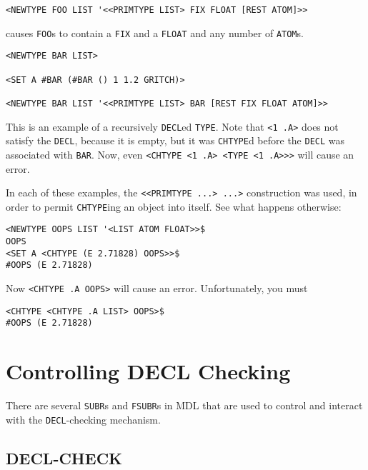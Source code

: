 \documentclass[a4paper]{scrbook}
\begin{document}
\begin{verbatim}
<NEWTYPE FOO LIST '<<PRIMTYPE LIST> FIX FLOAT [REST ATOM]>>
\end{verbatim}

causes \texttt{FOO}s to contain a \texttt{FIX} and a \texttt{FLOAT} and any number of \texttt{ATOM}s.

\begin{verbatim}
<NEWTYPE BAR LIST>

<SET A #BAR (#BAR () 1 1.2 GRITCH)>

<NEWTYPE BAR LIST '<<PRIMTYPE LIST> BAR [REST FIX FLOAT ATOM]>>
\end{verbatim}

This is an example of a recursively \texttt{DECL}ed \texttt{TYPE}. Note that \texttt{\textless{}1\ .A\textgreater{}} does
not satisfy the \texttt{DECL}, because it is empty, but it was \texttt{CHTYPE}d before the \texttt{DECL} was associated
with \texttt{BAR}. Now, even
\texttt{\textless{}CHTYPE\ \textless{}1\ .A\textgreater{}\ \textless{}TYPE\ \textless{}1\ .A\textgreater{}\textgreater{}\textgreater{}}
will cause an error.

In each of these examples, the \texttt{\textless{}\textless{}PRIMTYPE\ ...\textgreater{}\ ...\textgreater{}} construction
was used, in order to permit \texttt{CHTYPE}ing an object into itself. See what happens otherwise:

\begin{verbatim}
<NEWTYPE OOPS LIST '<LIST ATOM FLOAT>>$
OOPS
<SET A <CHTYPE (E 2.71828) OOPS>>$
#OOPS (E 2.71828)
\end{verbatim}

Now \texttt{\textless{}CHTYPE\ .A\ OOPS\textgreater{}} will cause an error. Unfortunately, you must

\begin{verbatim}
<CHTYPE <CHTYPE .A LIST> OOPS>$
#OOPS (E 2.71828)
\end{verbatim}

\section{Controlling DECL Checking}\label{controlling-decl-checking}

There are several \texttt{SUBR}s and \texttt{FSUBR}s in MDL that are used to control and interact with the
\texttt{DECL}-checking mechanism.

\subsection{DECL-CHECK}\label{decl-check}
\end{document}

